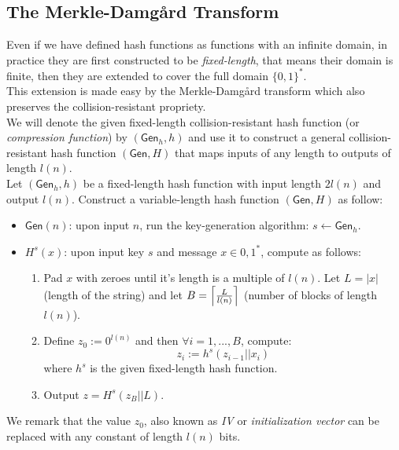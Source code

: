 \subsection{The Merkle-Damg\r{a}rd Transform}
Even if we have defined hash functions as functions with an infinite domain, in practice they are first constructed to be \emph{fixed-length}, that means their domain is finite, then they are extended to cover the full domain $\{0,1\}^{*}$.\\
This extension is made easy by the Merkle-Damg\r{a}rd transform which also preserves the collision-resistant propriety.\\
We will denote the given fixed-length collision-resistant hash function (or \emph{compression function}) by $(\mathsf{Gen}_h, h)$ and use it to construct a general collision-resistant hash function $(\mathsf{Gen}, H)$ that maps inputs of any length to outputs of length $l(n)$.\\
Let $(\mathsf{Gen}_h, h)$ be a fixed-length hash function with input length $2l(n)$ and output $l(n)$. Construct a variable-length hash function $(\mathsf{Gen}, H)$ as follow:
\begin{itemize}
    \item{$\mathsf{Gen}(n)$: upon input $n$, run the key-generation algorithm: $s \leftarrow \mathsf{Gen}_h$.}
    \item{$H^s(x)$: upon input key $s$ and message $x \in {0, 1}^{*}$, compute as follows:
        \begin{enumerate}
            \item{Pad $x$ with zeroes until it's length is a multiple of $l(n)$. Let $L = |x|$ (length of the string) and let $B = \ceil[\Big]{\frac{L}{l(n)}}$ (number of blocks of length $l(n)$).}
            \item{Define $z_0 := 0^{l(n)}$ and then $\forall i = 1,...,B$, compute:
                $$
                    z_i := h^s(z_{i-1}||x_i)
                $$
                where $h^s$ is the given fixed-length hash function.}
            \item{Output $z = H^s(z_B||L)$.}
        \end{enumerate}}
\end{itemize}
We remark that the value $z_0$, also known as \emph{IV} or \emph{initialization vector} can be replaced with any constant of length $l(n)$ bits.

